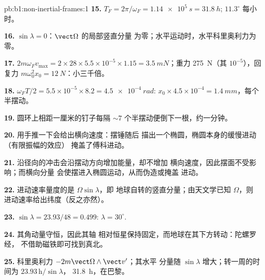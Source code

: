 \begin{solution}{pb:b1:non-inertial-frames:1}
\textbf{15.} $T_F = 2\pi/\omega_F = \qty{1.14e5}{s} = \qty{31.8}{h}$; $11.3^\circ$
每小时。

\textbf{16.} $\sin\lambda = 0$：$\vect\Omega$ 的局部竖直分量
为零；水平运动时，水平科里奥利力为零。

\textbf{17.} $2m\omega_Fv_{\max} = 2 \times 28 \times 5.5\times10^{-5} \times 1.15 =
\qty{3.5}{mN}$；重力 \qty{275}{N}（其 $10^{-5}$），回复力
$m\omega_0^2x_0 = \qty{12}{N}$：小三千倍。

\textbf{18.} $\omega_FT/2 = 5.5\times10^{-5} \times 8.2 = \qty{4.5e-4}{rad}$:
$x_0 \times 4.5\times10^{-4} = \qty{1.4}{mm}$，每个半摆动。

\textbf{19.} 圆环上相距一厘米的钉子每隔 $\sim 7$
个半摆动便倒下一根，约一分钟。

\textbf{20.} 用手推一下会给出横向速度：摆锤随后
描出一个椭圆，椭圆本身的缓慢进动（有限振幅的效应）
掩盖了傅科进动。

\textbf{21.} 沿径向的冲击会沿摆动方向增加能量，却不增加
横向速度，因此摆面不受影响；而横向分量
会使摆进入椭圆运动，从而伪造或掩盖
进动。

\textbf{22.} 进动速率量度的是 $\Omega\sin\lambda$，即
地球自转的竖直分量；由天文学已知 $\Omega$，则
进动速率给出纬度（反之亦然）。

\textbf{23.} $\sin\lambda = 23.93/48 = 0.499$: $\lambda = 30^\circ$.

\textbf{24.} 其角动量守恒，因此其轴
相对恒星保持固定，而地球在其下方转动：陀螺罗经，
不借助磁铁即可找到真北。

\textbf{25.} 科里奥利力 $-2m\vect\Omega\wedge\vect v'$；其水平
分量随 $\sin\lambda$ 增大；转一周的时间为 $23.93\,\text{h}/\sin\lambda$，
\qty{31.8}{h}，在巴黎。
\end{solution}
